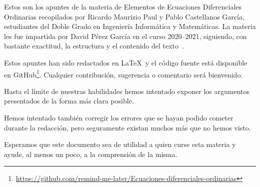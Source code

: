 \documentclass[ecuaciones_diferenciales.tex]{subfiles}
\begin{document}
Estos son los apuntes de la materia de Elementos de Ecuaciones Diferenciales
Ordinarias recopilados por Ricardo Maurizio Paul y Pablo Castellanos García,
estudiantes del Doble Grado en Ingeniería Informática y Matemáticas. La materia
les fue impartida por David Pérez García en el curso 2020--2021, siguiendo, con
bastante exactitud, la estructura y el contenido del texto~\cite{ecuaciones_lineales}.

Estos apuntes han sido redactados en \LaTeX{}\ y el código fuente 
está disponible en GitHub\footnote{\url{https://github.com/remind-me-later/Ecuaciones-diferenciales-ordinarias}}.
Cualquier contribución, sugerencia o comentario será bienvenido.

Hasta el límite de nuestras habilidades hemos intentado exponer los argumentos 
presentados de la forma más clara posible.

Hemos intentado también corregir los errores que se hayan podido cometer durante
la redacción, pero seguramente existan muchos más que no hemos visto.

Esperamos que este documento sea de utilidad a quien curse esta materia y ayude,
al menos un poco, a la comprensión de la misma.
\end{document}
